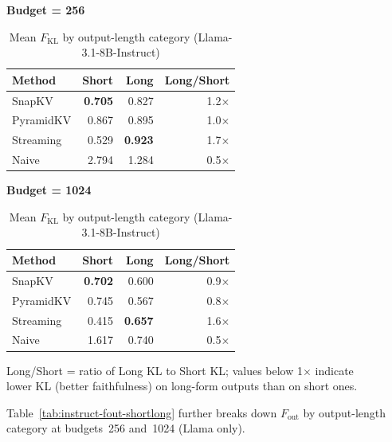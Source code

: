 \documentclass[10pt,letterpaper]{article}
\begin{document}
\begin{table}[H]
\centering
\small
\caption{Mean \(F_{\text{KL}}\) by output-length category (Llama-3.1-8B-Instruct)}
\label{tab:instruct-kl-shortlong}
\begin{minipage}[t]{0.47\textwidth}
\centering
\textbf{Budget = 256}\\[4pt]
\begin{tabular}{@{}lrrr@{}}
\toprule
Method & Short & Long & Long/Short\\
\midrule
SnapKV    & \textbf{0.705} & 0.827 & 1.2$\times$\\
PyramidKV & 0.867 & 0.895 & 1.0$\times$\\
Streaming & 0.529 & \textbf{0.923} & 1.7$\times$\\
Naive     & 2.794 & 1.284 & 0.5$\times$\\
\bottomrule
\end{tabular}
\end{minipage}
\hfill
\begin{minipage}[t]{0.47\textwidth}
\centering
\textbf{Budget = 1024}\\[4pt]
\begin{tabular}{@{}lrrr@{}}
\toprule
Method & Short & Long & Long/Short\\
\midrule
SnapKV    & \textbf{0.702} & 0.600 & 0.9$\times$\\
PyramidKV & 0.745 & 0.567 & 0.8$\times$\\
Streaming & 0.415 & \textbf{0.657} & 1.6$\times$\\
Naive     & 1.617 & 0.740 & 0.5$\times$\\
\bottomrule
\end{tabular}
\end{minipage}

\medskip
Long/Short = ratio of Long KL to Short KL; values below 1$\times$ indicate
\\lower KL (better faithfulness) on long-form outputs than on short ones.
\end{table}

Table~\ref{tab:instruct-fout-shortlong} further breaks down \(F_{\text{out}}\) by output-length category at budgets~256 and~1024 (Llama only).
\end{document}
